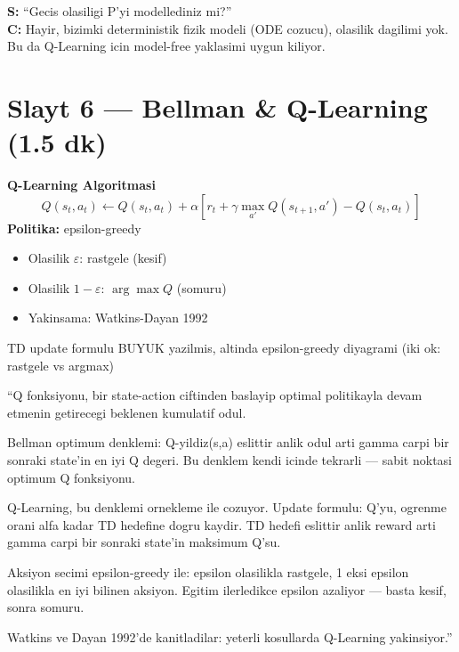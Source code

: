 \documentclass[11pt,a4paper]{article}
\begin{document}
\begin{soruboks}
\textbf{S:} ``Gecis olasiligi P'yi modellediniz mi?''\\
\textbf{C:} Hayir, bizimki deterministik fizik modeli (ODE cozucu), olasilik dagilimi yok. Bu da Q-Learning icin model-free yaklasimi uygun kiliyor.
\end{soruboks}

\section{Slayt 6 --- Bellman \& Q-Learning (1.5 dk)}

\begin{slytboks}
\textbf{Q-Learning Algoritmasi}
\[
Q(s_t, a_t) \leftarrow Q(s_t, a_t) + \alpha[r_t + \gamma \max_{a'} Q(s_{t+1}, a') - Q(s_t, a_t)]
\]
\textbf{Politika:} epsilon-greedy
\begin{itemize}
\item Olasilik $\varepsilon$: rastgele (kesif)
\item Olasilik $1-\varepsilon$: $\arg\max Q$ (somuru)
\item Yakinsama: Watkins-Dayan 1992
\end{itemize}
\end{slytboks}

\begin{gorselboks}
TD update formulu BUYUK yazilmis, altinda epsilon-greedy diyagrami (iki ok: rastgele vs argmax)
\end{gorselboks}

\begin{sayboks}
``Q fonksiyonu, bir state-action ciftinden baslayip optimal politikayla devam etmenin getirecegi beklenen kumulatif odul.

Bellman optimum denklemi: Q-yildiz(s,a) eslittir anlik odul arti gamma carpi bir sonraki state'in en iyi Q degeri. Bu denklem kendi icinde tekrarli --- sabit noktasi optimum Q fonksiyonu.

Q-Learning, bu denklemi ornekleme ile cozuyor. Update formulu: Q'yu, ogrenme orani alfa kadar TD hedefine dogru kaydir. TD hedefi eslittir anlik reward arti gamma carpi bir sonraki state'in maksimum Q'su.

Aksiyon secimi epsilon-greedy ile: epsilon olasilikla rastgele, 1 eksi epsilon olasilikla en iyi bilinen aksiyon. Egitim ilerledikce epsilon azaliyor --- basta kesif, sonra somuru.

Watkins ve Dayan 1992'de kanitladilar: yeterli kosullarda Q-Learning yakinsiyor.''
\end{sayboks}
\end{document}
